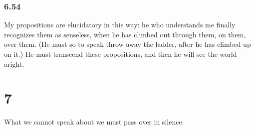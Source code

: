 \documentclass[11pt]{article}
\begin{document}
\subsubsection*{6.54}
\label{sec:org595923a}
My propositions are elucidatory in this way: he who understands me
finally recognizes them as senseless, when he has climbed out through them,
on them, over them. (He must so to speak throw away the ladder, after he
has climbed up on it.) He must transcend these propositions, and then he
will see the world aright.
\section*{7}
\label{sec:org0651e53}
What we cannot speak about we must pass over in silence.
\end{document}
